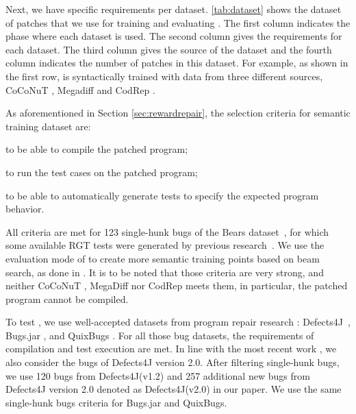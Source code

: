 Next, we have specific requirements per dataset.
\autoref{tab:dataset} shows the dataset of patches that we use for training and evaluating \approach.  
The first column indicates the phase where each dataset is used. 
The second column gives the requirements for each dataset. 
The third column gives the source of the dataset and the fourth column indicates the number of patches in this dataset.
For example, as shown in the first row, \approach is syntactically trained with data from three different sources, CoCoNuT \cite{CoCoNuT}, Megadiff \cite{monperrus2021megadiff} and CodRep \cite{Chen2018Coderep}. 

As aforementioned in Section \ref{sec:rewardrepair}, 
the selection criteria for semantic training dataset are:
\begin{inparaenum}[1)]
\item to be able to compile the patched program;
\item to run the test cases on the patched program;
\item to be able to automatically generate tests to specify the expected program behavior. 
\end{inparaenum}
All criteria are met for 123 single-hunk bugs of the Bears dataset~\cite{Bears}, for which some available RGT tests were generated by previous research~\cite{ODS}. 
We use the evaluation mode of \approach to create more semantic training points based on beam search, as done in \cite{kommrusch2021selfsupervised}.
It is to be noted that those criteria are very strong, and neither CoCoNuT \cite{CoCoNuT}, MegaDiff \cite{monperrus2021megadiff} nor CodRep \cite{Chen2018Coderep} meets them, in particular, the patched program cannot be compiled.

To test \approach, we  use well-accepted datasets from program repair research \cite{Liu2020Efficiency, Martinez2017experiment, Durieux:2019:RepairThemAll, quixbugs-jss}:
Defects4J~\cite{defects4j}, 
Bugs.jar \cite{Bugsjar-MSR18}, and QuixBugs \cite{lin2017quixbugs}.
For all those bug datasets, the requirements of compilation and test execution are met.
In line with the most recent work \cite{Recoder}, we also consider the bugs of Defects4J version 2.0.
After filtering single-hunk bugs, we use 120 bugs from Defects4J(v1.2) and 257 additional new bugs from Defects4J version 2.0  denoted as Defects4J(v2.0) in our paper.
We use the same single-hunk bugs criteria for Bugs.jar and QuixBugs.

